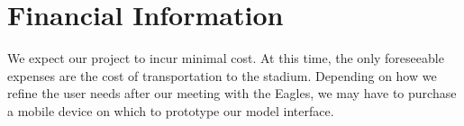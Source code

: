 \documentclass[12pt]{article}
\begin{document}
\makereferences

\makebibliography


\section{Financial Information}
We expect our project to incur minimal cost. At this time, the only
foreseeable expenses are the cost of transportation to the
stadium. Depending on how we refine the user needs after our meeting
with the Eagles, we may have to purchase a mobile device on which to
prototype our model interface.


\appendix
\end{document}
